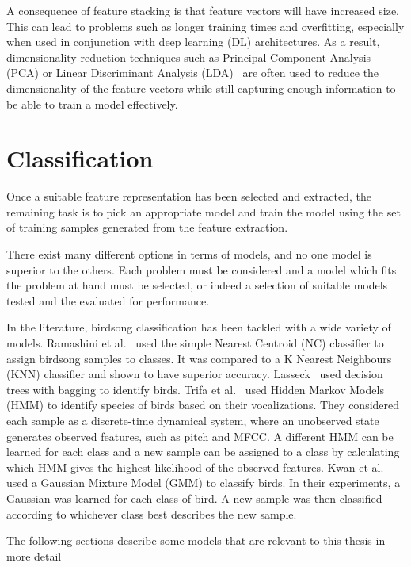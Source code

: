 A consequence of feature stacking is that feature vectors will have increased
size. This can lead to problems such as longer training times and overfitting,
especially when used in conjunction with deep learning (DL) architectures. As a
result, dimensionality reduction techniques such as Principal Component
Analysis (PCA) or Linear Discriminant Analysis (LDA)~\cite{ramashini2019bird}
are often used to reduce the dimensionality of the feature vectors while still
capturing enough information to be able to train a model effectively.

\section{Classification}\label{sec:classification}

Once a suitable feature representation has been selected and extracted, the
remaining task is to pick an appropriate model and train the model using the set
of training samples generated from the feature extraction.

There exist many different options in terms of models, and no one model is
superior to the others. Each problem must be considered and a model which fits
the problem at hand must be selected, or indeed a selection of suitable models
tested and the evaluated for performance.

In the literature, birdsong classification has been tackled with a wide variety
of models. Ramashini et al.~\cite{ramashini2019bird} used the simple Nearest
Centroid (NC) classifier to assign birdsong samples to classes. It was compared
to a K Nearest Neighbours (KNN) classifier and shown to have superior accuracy.
Lasseck~\cite{lasseck2015improved} used decision trees with bagging to identify
birds. Trifa et al.~\cite{trifa2008automated} used Hidden Markov Models (HMM) to
identify species of birds based on their vocalizations. They considered each
sample as a discrete-time dynamical system, where an unobserved state generates
observed features, such as pitch and MFCC\@. A different HMM can be learned for
each class and a new sample can be assigned to a class by calculating which HMM
gives the highest likelihood of the observed features. Kwan et
al.~\cite{kwan2006automated} used a Gaussian Mixture Model (GMM) to classify
birds. In their experiments, a Gaussian was learned for each class of bird. A
new sample was then classified according to whichever class best describes the
new sample.

The following sections describe some models that are relevant to this thesis in
more detail

